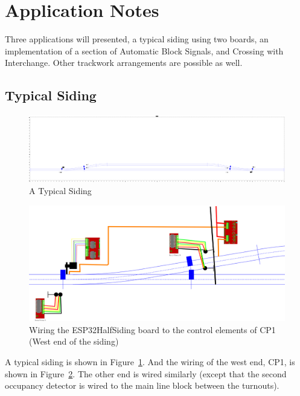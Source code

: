 \clearpage
\section{Application Notes}

Three applications will presented, a typical siding using two boards, an 
implementation of a section of Automatic Block Signals, and Crossing with 
Interchange.  Other trackwork arrangements are possible as well.


\subsection{Typical Siding}

\begin{figure}[hbpt]\begin{centering}%
\includegraphics[width=5in]{ExampleSiding.png}
\caption{A Typical Siding}
\label{fig:ExampleSiding}
\end{centering}\end{figure}
\begin{figure}[hbpt]\begin{centering}%
\includegraphics[width=5in]{ESP32HalfSiding-CP1Wiring.png}
\caption{Wiring the ESP32HalfSiding board to the control elements of CP1 (West 
end of the siding)}
\label{fig:ESP32HalfSiding-CP1Wiring}
\end{centering}\end{figure}
A typical siding is shown in Figure~\ref{fig:ExampleSiding}. And the wiring of 
the west end, CP1, is shown in Figure~\ref{fig:ESP32HalfSiding-CP1Wiring}. The 
other end is wired similarly (except that the second occupancy detector is 
wired to the main line block between the turnouts).

